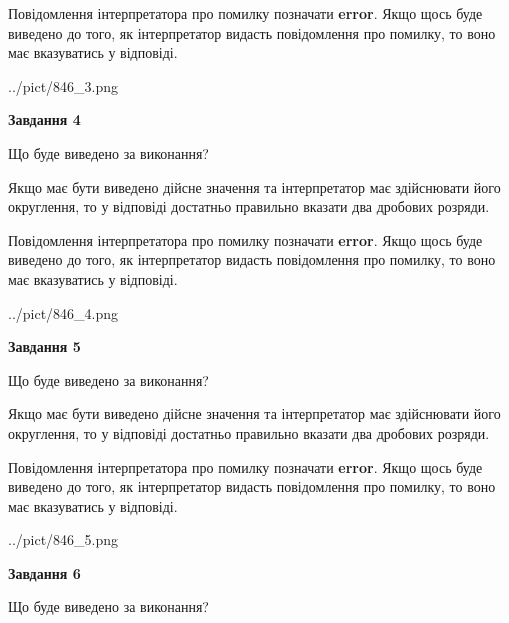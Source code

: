\documentclass[12pt, ukrainian]{article}
\begin{document}
{\begin {Large}
Повідомлення інтерпретатора про помилку позначати \textbf{error}.
Якщо щось буде виведено до того, як інтерпретатор видасть повідомлення про помилку, 
то воно має вказуватись у відповіді. \par

\begin{center}
	{../pict/846_3.png}
\end{center}
\newpage

{\begin {center}\textbf{Завдання 4}\end {center}}\par
Що буде виведено за виконання? \par

Якщо має бути виведено дійсне значення та інтерпретатор має здійснювати його округлення, 
то у відповіді достатньо правильно вказати два дробових розряди.

Повідомлення інтерпретатора про помилку позначати \textbf{error}.
Якщо щось буде виведено до того, як інтерпретатор видасть повідомлення про помилку, 
то воно має вказуватись у відповіді. \par

\begin{center}
	{../pict/846_4.png}
\end{center}
\newpage

{\begin {center}\textbf{Завдання 5}\end {center}}\par
Що буде виведено за виконання? \par

Якщо має бути виведено дійсне значення та інтерпретатор має здійснювати його округлення, 
то у відповіді достатньо правильно вказати два дробових розряди.

Повідомлення інтерпретатора про помилку позначати \textbf{error}.
Якщо щось буде виведено до того, як інтерпретатор видасть повідомлення про помилку, 
то воно має вказуватись у відповіді. \par

\begin{center}
	{../pict/846_5.png}
\end{center}
\newpage

{\begin {center}\textbf{Завдання 6}\end {center}}\par
Що буде виведено за виконання? \par


\end{Large}}
\end{document}
